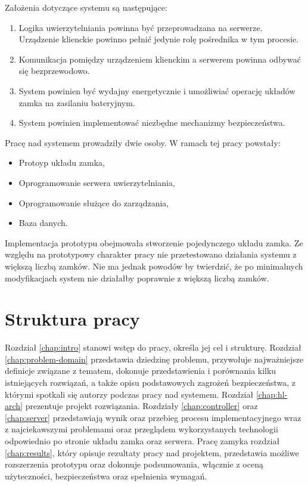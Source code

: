 		Założenia dotyczące systemu są następujące:

		\begin{enumerate}
		    \item Logika uwierzytelniania powinna być przeprowadzana na serwerze. Urządzenie klienckie powinno pełnić jedynie rolę pośrednika w tym procesie.
		    \item Komunikacja pomiędzy urządzeniem klienckim a serwerem powinna odbywać się bezprzewodowo.
		    \item System powinien być wydajny energetycznie i umożliwiać operację układów zamka na zasilaniu bateryjnym.
		    \item System powinien implementować niezbędne mechanizmy bezpieczeństwa.
		\end{enumerate}

		Pracę nad systemem prowadziły dwie osoby. W ramach tej pracy powstały:

		\begin{itemize}
		    \item Protoyp układu zamka,
		    \item Oprogramowanie serwera uwierzytelniania,
		    \item Oprogramowanie służące do zarządzania,
		    \item Baza danych.
		\end{itemize}

		Implementacja prototypu obejmowała stworzenie pojedynczego układu zamka. Ze względu na prototypowy charakter pracy nie przetestowano działania systemu z większą liczbą zamków. Nie ma jednak powodów by twierdzić, że po minimalnych modyfikacjach system nie działałby poprawnie z większą liczbą zamków.

	\section{Struktura pracy}

		Rozdział \ref{chap:intro} stanowi wstęp do pracy, określa jej cel i strukturę. Rozdział \ref{chap:problem-domain} przedstawia dziedzinę problemu, przywołuje najważniejsze definicje związane z tematem, dokonuje przedstawienia i porównania kilku istniejących rozwiązań, a także opisu podstawowych zagrożeń bezpieczeństwa, z którymi spotkali się autorzy podczas pracy nad systemem. Rozdział \ref{chap:hl-arch} prezentuje projekt rozwiązania. Rozdziały \ref{chap:controller} oraz \ref{chap:server} przedstawiają wynik oraz przebieg procesu implementacyjnego wraz z najciekawszymi problemami oraz przeglądem wykorzystanych technologii odpowiednio po stronie układu zamka oraz serwera. Pracę zamyka rozdział \ref{chap:results}, który opisuje rezultaty pracy nad projektem, przedstawia możliwe rozszerzenia prototypu oraz dokonuje podsumowania, włącznie z oceną użyteczności, bezpieczeństwa oraz spełnienia wymagań.